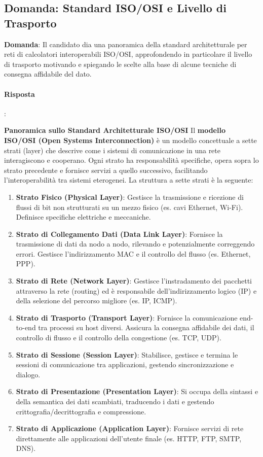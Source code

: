 
\subsection*{Domanda: Standard ISO/OSI e Livello di Trasporto}

\textbf{Domanda}: Il candidato dia una panoramica della standard architetturale per reti di calcolatori interoperabili ISO/OSI, approfondendo in particolare il livello di trasporto motivando e spiegando le scelte alla base di alcune tecniche di consegna affidabile del dato.

\paragraph{Risposta}:

\textbf{Panoramica sullo Standard Architetturale ISO/OSI}
Il \textbf{modello ISO/OSI (Open Systems Interconnection)} è un modello concettuale a sette strati (layer) che descrive come i sistemi di comunicazione in una rete interagiscono e cooperano. Ogni strato ha responsabilità specifiche, opera sopra lo strato precedente e fornisce servizi a quello successivo, facilitando l'interoperabilità tra sistemi eterogenei.
La struttura a sette strati è la seguente:
\begin{enumerate}
    \item \textbf{Strato Fisico (Physical Layer)}: Gestisce la trasmissione e ricezione di flussi di bit non strutturati su un mezzo fisico (es. cavi Ethernet, Wi-Fi). Definisce specifiche elettriche e meccaniche.
    \item \textbf{Strato di Collegamento Dati (Data Link Layer)}: Fornisce la trasmissione di dati da nodo a nodo, rilevando e potenzialmente correggendo errori. Gestisce l'indirizzamento MAC e il controllo del flusso (es. Ethernet, PPP).
    \item \textbf{Strato di Rete (Network Layer)}: Gestisce l'instradamento dei pacchetti attraverso la rete (routing) ed è responsabile dell'indirizzamento logico (IP) e della selezione del percorso migliore (es. IP, ICMP).
    \item \textbf{Strato di Trasporto (Transport Layer)}: Fornisce la comunicazione end-to-end tra processi su host diversi. Assicura la consegna affidabile dei dati, il controllo di flusso e il controllo della congestione (es. TCP, UDP).
    \item \textbf{Strato di Sessione (Session Layer)}: Stabilisce, gestisce e termina le sessioni di comunicazione tra applicazioni, gestendo sincronizzazione e dialogo.
    \item \textbf{Strato di Presentazione (Presentation Layer)}: Si occupa della sintassi e della semantica dei dati scambiati, traducendo i dati e gestendo crittografia/decrittografia e compressione.
    \item \textbf{Strato di Applicazione (Application Layer)}: Fornisce servizi di rete direttamente alle applicazioni dell'utente finale (es. HTTP, FTP, SMTP, DNS).
\end{enumerate}

